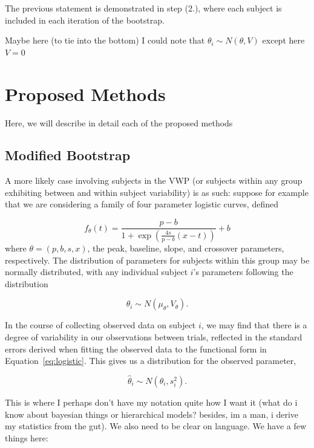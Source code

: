 \documentclass{article}
\begin{document}
The previous statement is demonstrated in step (2.), where each subject is included in each iteration of the bootstrap.

Maybe here (to tie into the bottom) I could note that $\theta_i \sim N(\theta, V)$ except here $V = 0$


\section{Proposed Methods}

Here, we will describe in detail each of the proposed methods

\subsection{Modified Bootstrap}

A more likely case involving subjects in the VWP (or subjects within any group exhibiting between and within subject variability) is as such: suppose for example that we are considering a family of four parameter logistic curves, defined

\begin{equation}\label{eq:logistic}
f_{\theta}(t) = \frac{p-b}{1 + \exp \left(\frac{4s}{\text{p}-b} (x - t) \right)} + b
\end{equation}
where $\theta = (p, b, s, x)$, the peak, baseline, slope, and crossover parameters, respectively. The distribution of parameters for subjects within this group may be normally distributed, with any individual subject $i$'s parameters following the distribution

\begin{equation}
\theta_i \sim N(\mu_{\theta}, V_{\theta}).
\end{equation}

In the course of collecting observed data on subject $i$, we may find that there is a degree of variability in our observations between trials, reflected in the standard errors derived when fitting the observed data to the functional form in Equation~\ref{eq:logistic}. This gives us a distribution for the observed parameter, 

\begin{equation}
\hat{\theta}_i \sim N(\theta_i, s_i^2).
\end{equation}

This is where I perhaps don't have my notation quite how I want it (what do i know about bayesian things or hierarchical models? besides, im a man, i derive my statistics from the gut). We also need to be clear on language. We have a few things here:
\end{document}
